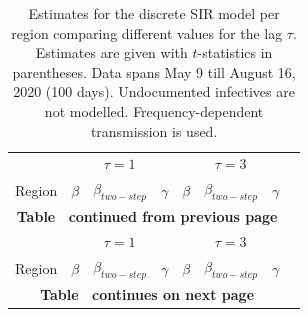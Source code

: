 \documentclass[12pt]{article}
\begin{document}
\begin{appendices}
        \begin{landscape}
    	\begin{longtable}{@{}lccccccc@{}}
    		\caption{Estimates for the discrete SIR model per region comparing different values for the lag $\tau$. Estimates are given with $t$-statistics in parentheses. Data spans May 9 till August 16, 2020 (100 days). Undocumented infectives are not modelled. Frequency-dependent transmission is used.}
    		\label{tab:results_discrete_regional_tau}\\
    		\toprule
    		                & \multicolumn{3}{c}{$\tau = 1$} & \multicolumn{3}{c}{$\tau = 3$} \\
    		                \cmidrule(lr){2-4}
                            \cmidrule(lr){5-7}
    		Region          & $\beta$ & $\beta_{two-step}$ & $\gamma$ & $\beta$ & $\beta_{two-step}$ & $\gamma$ \\* \midrule
    		\endfirsthead
    		
    		\multicolumn{7}{c}{{\bfseries Table \thetable\ continued from previous page}} \\
    		\toprule
    		                & \multicolumn{3}{c}{$\tau = 1$} & \multicolumn{3}{c}{$\tau = 3$} \\
    		                \cmidrule(lr){2-4}
                            \cmidrule(lr){5-7}
    		Region          & $\beta$ & $\beta_{two-step}$ & $\gamma$ & $\beta$ & $\beta_{two-step}$ & $\gamma$ \\* \midrule
    		\endhead
    		
    		\bottomrule
    		\multicolumn{7}{c}{{\bfseries Table \thetable\ continues on next page}}
    		\endfoot
    		

\end{longtable}
\end{landscape}
\end{appendices}
\end{document}
